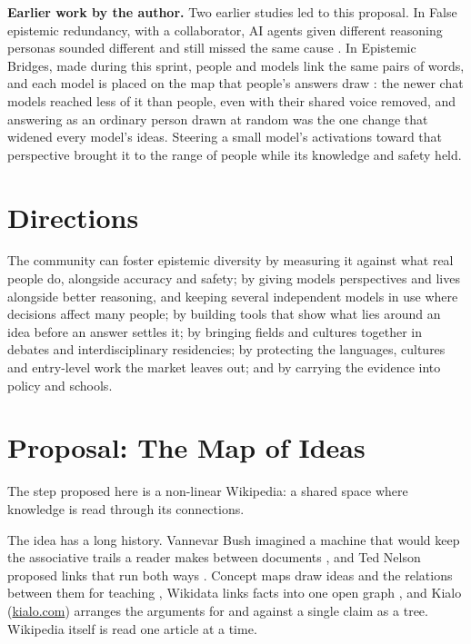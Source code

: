 \documentclass[11pt]{article}
\begin{document}
\textbf{Earlier work by the author.} Two earlier studies led to this proposal. In False epistemic redundancy, with a collaborator, AI agents given different reasoning personas sounded different and still missed the same cause \citep{gallego2026fer}. In Epistemic Bridges, made during this sprint, people and models link the same pairs of words, and each model is placed on the map that people's answers draw \citep{gallego2026bridges}: the newer chat models reached less of it than people, even with their shared voice removed, and answering as an ordinary person drawn at random was the one change that widened every model's ideas. Steering a small model's activations toward that perspective brought it to the range of people while its knowledge and safety held.

\section{Directions}

The community can foster epistemic diversity by measuring it against what real people do, alongside accuracy and safety; by giving models perspectives and lives alongside better reasoning, and keeping several independent models in use where decisions affect many people; by building tools that show what lies around an idea before an answer settles it; by bringing fields and cultures together in debates and interdisciplinary residencies; by protecting the languages, cultures and entry-level work the market leaves out; and by carrying the evidence into policy and schools.

\section{Proposal: The Map of Ideas}

The step proposed here is a non-linear Wikipedia: a shared space where knowledge is read through its connections.

The idea has a long history. Vannevar Bush imagined a machine that would keep the associative trails a reader makes between documents \citep{bush1945}, and Ted Nelson proposed links that run both ways \citep{nelson1965}. Concept maps draw ideas and the relations between them for teaching \citep{novak2008}, Wikidata links facts into one open graph \citep{vrandecic2014}, and Kialo (\href{https://www.kialo.com}{kialo.com}) arranges the arguments for and against a single claim as a tree. Wikipedia itself is read one article at a time.
\end{document}
